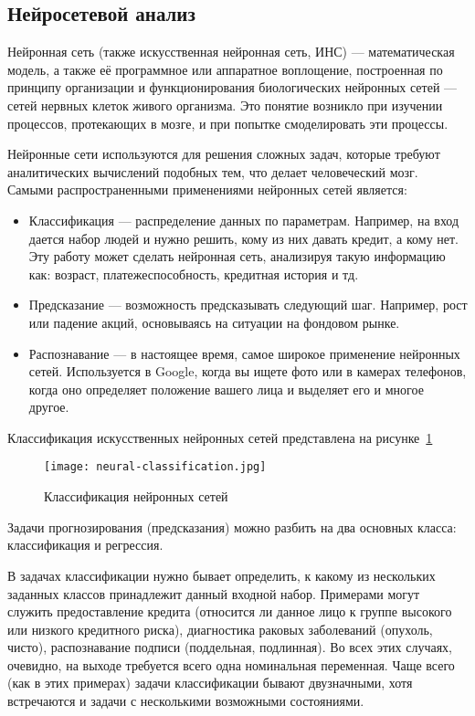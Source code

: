 \subsection{Нейросетевой анализ}
\label{sec:analysis:neural_networks}

Нейронная сеть (также искусственная нейронная сеть, ИНС) — математическая модель, а также её программное или аппаратное
воплощение, построенная по принципу организации и функционирования биологических нейронных сетей — сетей нервных клеток
живого организма. Это понятие возникло при изучении процессов, протекающих в мозге, и при попытке смоделировать эти
процессы.

Нейронные сети используются для решения сложных задач, которые требуют аналитических вычислений подобных тем, что
делает человеческий мозг. Самыми распространенными применениями нейронных сетей является:

\begin{itemize}
  \item Классификация — распределение данных по параметрам. Например, на вход дается набор людей и нужно решить, кому из них давать кредит, а кому нет. Эту работу может сделать нейронная сеть, анализируя такую информацию как: возраст, платежеспособность, кредитная история и тд.
  \item Предсказание — возможность предсказывать следующий шаг. Например, рост или падение акций, основываясь на ситуации на фондовом рынке.
  \item Распознавание — в настоящее время, самое широкое применение нейронных сетей. Используется в Google, когда вы ищете фото или в камерах телефонов, когда оно определяет положение вашего лица и выделяет его и многое другое.
\end{itemize}

Классификация искусственных нейронных сетей представлена на рисунке~\ref{fig:analysis:neural-classification}

\begin{figure}[!ht]
  \centering
  \texttt{[image: neural-classification.jpg]} 
  \caption{Классификация нейронных сетей}
  \label{fig:analysis:neural-classification}
\end{figure}

Задачи прогнозирования (предсказания) можно разбить на два основных класса: классификация и регрессия.

В задачах классификации нужно бывает определить, к какому из \linebreak
нескольких заданных классов принадлежит данный входной
набор. Примерами могут служить предоставление кредита (относится ли данное лицо к группе высокого или низкого
кредитного риска), диагностика раковых заболеваний (опухоль, чисто), распознавание подписи (поддельная, подлинная).
Во всех этих случаях, очевидно, на выходе требуется всего одна номинальная переменная.
Чаще всего (как в этих примерах) задачи классификации бывают двузначными, хотя встречаются и задачи с несколькими
возможными состояниями.

